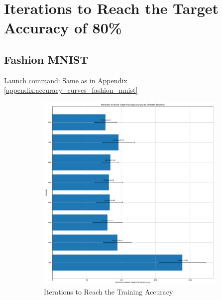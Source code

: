 \section{Iterations to Reach the Target Accuracy of 80\%}
\label{appendix:iterations}

    \subsection{Fashion MNIST}
    \label{appendix:iterations_fashion_mnist}
        Launch command: Same as in Appendix \ref{appendix:accuracy_curves_fashion_mnist}
        \begin{figure}[H]
            \centering
            \begin{subfigure}[H]{0.48\textwidth}
                \centering
                \includegraphics[width=\textwidth]{../standard/FashionMNIST/plots/fashionmnist_train_iters.pdf}
                \caption{Iterations to Reach the Training Accuracy}
            \end{subfigure}
            \hfill
            \begin{subfigure}[H]{0.48\textwidth}
                \centering

\end{subfigure}
\end{figure}

